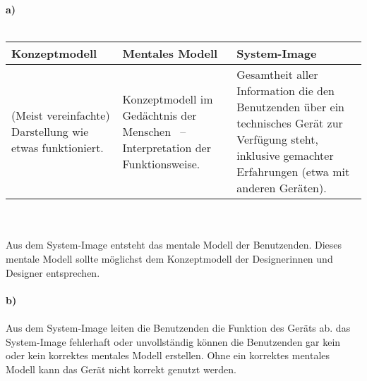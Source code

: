 \textbf{a)}\\\\
\begin{tabularx}{\linewidth}{|X|X|X|}
  \hline
  \textbf{Konzeptmodell} & \textbf{Mentales Modell} & \textbf{System-Image} \\
  \hline
  (Meist vereinfachte) Darstellung wie etwas funktioniert. & 
  Konzeptmodell im Gedächtnis der Menschen ~--~ Interpretation der Funktionsweise. &
  Gesamtheit aller Information die den Benutzenden über ein technisches Gerät zur Verfügung steht, inklusive gemachter Erfahrungen (etwa mit anderen Geräten).\\
  \hline
\end{tabularx}
\\\\
Aus dem System-Image entsteht das mentale Modell der Benutzenden.
Dieses mentale Modell sollte möglichst dem Konzeptmodell der Designerinnen und Designer entsprechen.
\\\\
\textbf{b)}
\\\\
Aus dem System-Image leiten die Benutzenden die Funktion des Geräts ab.
das System-Image fehlerhaft oder unvollständig können die Benutzenden
gar kein oder kein korrektes mentales Modell erstellen. 
Ohne ein korrektes mentales Modell kann das Gerät nicht korrekt genutzt werden.